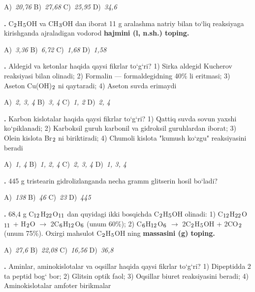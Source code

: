 \documentclass[11pt,a4paper]{article}
\renewcommand{\textsubscript}[1]{\ensuremath{_{\text{\fontsize{8}{8}\selectfont #1}}}}
\newcommand{\qn}[1]{\textbf{\fontsize{11.5}{13}\selectfont #1}}
\newcommand{\qsep}{\par\vspace{1pt}\noindent\rule{0pt}{0.4pt}\par\vspace{5pt}}
\begin{document}
\begin{multicols}{2}
\noindent A)~\textsl{20,76} \hfill B)~\textsl{27,68} \hfill C)~\textsl{25,95} \hfill D)~\textsl{34,6}\par
\qsep
\noindent\qn{23.} C\textsubscript{2}H\textsubscript{5}OH va CH\textsubscript{3}OH dan iborat 11 g aralashma natriy bilan to`liq reaksiyaga kirishganda ajraladigan vodorod \textbf{hajmini (l, n.sh.) toping.}

\noindent A)~\textsl{3,36} \hfill B)~\textsl{6,72} \hfill C)~\textsl{1,68} \hfill D)~\textsl{1,58}\par
\qsep
\noindent\qn{24.} Aldegid va ketonlar haqida qaysi fikrlar to`g`ri? 1) Sirka aldegid Kucherov reaksiyasi bilan olinadi; 2) Formalin --- formaldegidning 40\% li eritmasi; 3) Aseton Cu(OH)\textsubscript{2} ni qaytaradi; 4) Aseton suvda erimaydi

\noindent A)~\textsl{2, 3, 4} \hfill B)~\textsl{3, 4} \hfill C)~\textsl{1, 2} \hfill D)~\textsl{2, 4}\par
\qsep
\noindent\qn{25.} Karbon kislotalar haqida qaysi fikrlar to`g`ri? 1) Qattiq suvda sovun yaxshi ko`piklanadi; 2) Karboksil guruh karbonil va gidroksil guruhlardan iborat; 3) Olein kislota Br\textsubscript{2} ni biriktiradi; 4) Chumoli kislota "kumush ko`zgu" reaksiyasini beradi

\noindent A)~\textsl{1, 4} \hfill B)~\textsl{1, 2, 4} \hfill C)~\textsl{2, 3, 4} \hfill D)~\textsl{1, 3, 4}\par
\qsep
\noindent\qn{26.} 445 g tristearin gidrolizlanganda necha gramm glitserin hosil bo`ladi?

\noindent A)~\textsl{138} \hfill B)~\textsl{46} \hfill C)~\textsl{23} \hfill D)~\textsl{445}\par
\qsep
\noindent\qn{27.} 68,4 g C\textsubscript{12}H\textsubscript{22}O\textsubscript{11} dan quyidagi ikki bosqichda C\textsubscript{2}H\textsubscript{5}OH olinadi: 1) C\textsubscript{12}H\textsubscript{22}O\textsubscript{11} + H\textsubscript{2}O $\to$ 2C\textsubscript{6}H\textsubscript{12}O\textsubscript{6} (unum 60\%); 2) C\textsubscript{6}H\textsubscript{12}O\textsubscript{6} $\to$ 2C\textsubscript{2}H\textsubscript{5}OH + 2CO\textsubscript{2} (unum 75\%). Oxirgi mahsulot C\textsubscript{2}H\textsubscript{5}OH ning \textbf{massasini (g) toping.}

\noindent A)~\textsl{27,6} \hfill B)~\textsl{22,08} \hfill C)~\textsl{16,56} \hfill D)~\textsl{36,8}\par
\qsep
\noindent\qn{28.} Aminlar, aminokislotalar va oqsillar haqida qaysi fikrlar to`g`ri? 1) Dipeptidda 2 ta peptid bog` bor; 2) Glitsin optik faol; 3) Oqsillar biuret reaksiyasini beradi; 4) Aminokislotalar amfoter birikmalar


\end{multicols}
\end{document}
